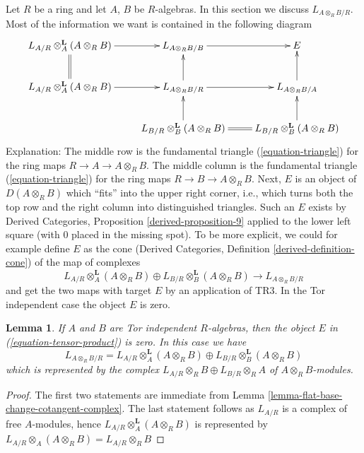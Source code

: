 \documentclass{stacks-project}
\theoremstyle{plain}
\newtheorem{lemma}[subsection]{Lemma}
\theoremstyle{definition}
\theoremstyle{remark}
\numberwithin{equation}{subsection}
\begin{document}
\noindent
Let $R$ be a ring and let $A$, $B$ be $R$-algebras. In this section we
discuss $L_{A \otimes_R B/R}$. Most of the information we want is contained
in the following diagram
\begin{equation}
\label{equation-tensor-product}
\vcenter{
\xymatrix{
L_{A/R} \otimes_A^\mathbf{L} (A \otimes_R B) \ar[r] &
L_{A \otimes_R B/B} \ar[r] &
E \\
L_{A/R} \otimes_A^\mathbf{L} (A \otimes_R B) \ar[r] \ar@{=}[u] &
L_{A \otimes_R B/R} \ar[r] \ar[u] &
L_{A \otimes_R B/A} \ar[u] \\
 &
L_{B/R} \otimes_B^\mathbf{L} (A \otimes_R B) \ar[u] \ar@{=}[r] &
L_{B/R} \otimes_B^\mathbf{L} (A \otimes_R B) \ar[u]
}
}
\end{equation}
Explanation: The middle row is the fundamental triangle
(\ref{equation-triangle}) for the ring maps $R \to A \to A \otimes_R B$.
The middle column is the fundamental triangle
(\ref{equation-triangle}) for the ring maps $R \to B \to A \otimes_R B$.
Next, $E$ is an object of $D(A \otimes_R B)$ which ``fits'' into the
upper right corner, i.e., which turns both the top row
and the right column into distinguished triangles. Such an $E$
exists by Derived Categories, Proposition \ref{derived-proposition-9}
applied to the lower left square (with $0$ placed in the missing
spot). To be more explicit, we could for example define $E$ as the cone
(Derived Categories, Definition \ref{derived-definition-cone})
of the map of complexes
$$
L_{A/R} \otimes_A^\mathbf{L} (A \otimes_R B) \oplus
L_{B/R} \otimes_B^\mathbf{L} (A \otimes_R B)
\longrightarrow
L_{A \otimes_R B/R}
$$
and get the two maps with target $E$ by an application of TR3.
In the Tor independent case the object $E$ is zero.

\begin{lemma}
\label{lemma-tensor-product-tor-independent}
If $A$ and $B$ are Tor independent $R$-algebras, then the object $E$
in (\ref{equation-tensor-product}) is zero. In this case we have
$$
L_{A \otimes_R B/R} =
L_{A/R} \otimes_A^\mathbf{L} (A \otimes_R B) \oplus
L_{B/R} \otimes_B^\mathbf{L} (A \otimes_R B)
$$
which is represented by the complex
$L_{A/R} \otimes_R B \oplus L_{B/R} \otimes_R A $
of $A \otimes_R B$-modules.
\end{lemma}

\begin{proof}
The first two statements are immediate from
Lemma \ref{lemma-flat-base-change-cotangent-complex}.
The last statement follows as $L_{A/R}$ is a complex
of free $A$-modules, hence $L_{A/R} \otimes_A^\mathbf{L} (A \otimes_R B)$
is represented by
$L_{A/R} \otimes_A (A \otimes_R B) = L_{A/R} \otimes_R B$
\end{proof}
\end{document}
